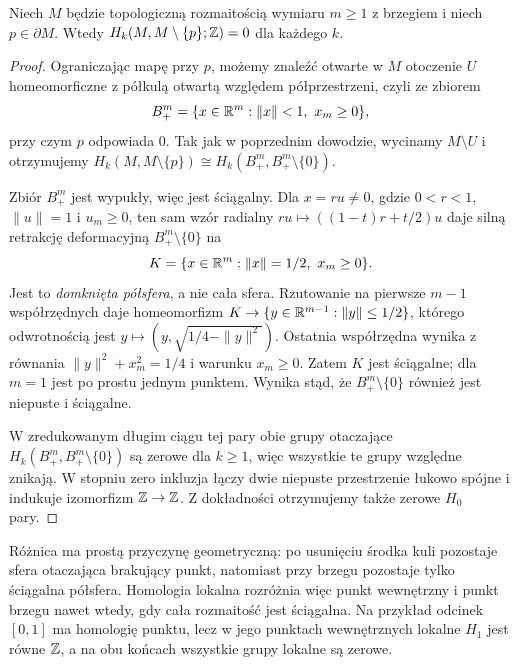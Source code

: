 \begin{stwierdzenie}
\label{prop:lokalna-homologia-brzeg-8}
Niech $M$ będzie topologiczną rozmaitością wymiaru $m\geq1$
z brzegiem i niech $p\in\partial M$.
Wtedy $H_k(M,M\setminus\{p\};\mathbb{Z})=0$ dla każdego $k$.
\end{stwierdzenie}
\begin{proof}
Ograniczając mapę przy $p$, możemy znaleźć otwarte w $M$
otoczenie $U$ homeomorficzne z półkulą otwartą względem
półprzestrzeni, czyli ze zbiorem
\[
 B_+^m=\{x\in\R^m:\|x\|<1,\ x_m\geq0\},
\]
przy czym $p$ odpowiada $0$. Tak jak w poprzednim dowodzie,
wycinamy $M\setminus U$ i otrzymujemy
$H_k(M,M\setminus\{p\})\cong H_k(B_+^m,B_+^m\setminus\{0\})$.

Zbiór $B_+^m$ jest wypukły, więc jest ściągalny.
Dla $x=ru\ne0$, gdzie $0<r<1$, $\|u\|=1$ i $u_m\geq0$,
ten sam wzór radialny
$ru\mapsto((1-t)r+t/2)u$ daje silną retrakcję deformacyjną
$B_+^m\setminus\{0\}$ na
\[
 K=\{x\in\R^m:\|x\|=1/2,\ x_m\geq0\}.
\]
Jest to \emph{domknięta półsfera}, a nie cała sfera.
Rzutowanie na pierwsze $m-1$ współrzędnych daje homeomorfizm
$K\to\{y\in\mathbb{R}^{m-1}:\|y\|\leq1/2\}$,
którego odwrotnością jest
$y\mapsto(y,\sqrt{1/4-\|y\|^2})$.
Ostatnia współrzędna wynika z równania
$\|y\|^2+x_m^2=1/4$ i warunku $x_m\geq0$.
Zatem $K$ jest ściągalne; dla $m=1$ jest po prostu jednym punktem.
Wynika stąd, że $B_+^m\setminus\{0\}$ również jest niepuste
i ściągalne.

W zredukowanym długim ciągu tej pary obie grupy otaczające
$H_k(B_+^m,B_+^m\setminus\{0\})$ są zerowe dla $k\geq1$,
więc wszystkie te grupy względne znikają.
W stopniu zero inkluzja łączy dwie niepuste przestrzenie
łukowo spójne i indukuje izomorfizm $\mathbb{Z}\to\mathbb{Z}$.
Z dokładności otrzymujemy także zerowe $H_0$ pary.
\end{proof}

Różnica ma prostą przyczynę geometryczną: po usunięciu
środka kuli pozostaje sfera otaczająca brakujący punkt,
natomiast przy brzegu pozostaje tylko ściągalna półsfera.
Homologia lokalna rozróżnia więc punkt wewnętrzny i punkt
brzegu nawet wtedy, gdy cała rozmaitość jest ściągalna.
Na przykład odcinek $[0,1]$ ma homologię punktu,
lecz w jego punktach wewnętrznych lokalne $H_1$ jest równe $\mathbb{Z}$,
a na obu końcach wszystkie grupy lokalne są zerowe.

